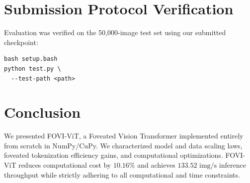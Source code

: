 \documentclass[10pt,conference]{IEEEtran}
\begin{document}
\section{Submission Protocol Verification}
Evaluation was verified on the 50,000-image test set using our submitted checkpoint:
\begin{verbatim}
bash setup.bash
python test.py \
  --test-path <path>
\end{verbatim}

\begin{table}[h]
\centering
\caption{Verified Test Evaluation Results (Logs: test\_20260903\_180152.log)}
\label{tab:test_results}
\end{table}

\section{Conclusion}
We presented FOVI-ViT, a Foveated Vision Transformer implemented entirely from scratch in NumPy/CuPy. We characterized model and data scaling laws, foveated tokenization efficiency gains, and computational optimizations. FOVI-ViT reduces computational cost by $10.16\%$ and achieves $133.52\text{ img/s}$ inference throughput while strictly adhering to all computational and time constraints.
\end{document}
